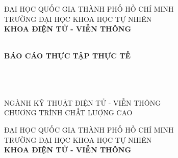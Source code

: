 \hypersetup{pageanchor=false}
\begin{titlepage}

\begin{center}
ĐẠI HỌC QUỐC GIA THÀNH PHỐ HỒ CHÍ MINH\\
TRƯỜNG ĐẠI HỌC KHOA HỌC TỰ NHIÊN\\
\textbf{KHOA ĐIỆN TỬ - VIỄN THÔNG}\\[2cm]


{ \Large \bfseries {} \\[2cm] } 

{ \Large \bfseries \textbf{BÁO CÁO THỰC TẬP THỰC TẾ} \\[3cm]} 


\large \tenKL \\ 
\large \text{} \\ 
\large \text{} \\
\large NGÀNH KỸ THUẬT ĐIỆN TỬ - VIỄN THÔNG\\
\large CHƯƠNG TRÌNH CHẤT LƯỢNG CAO\\


\vfill
{}

\end{center}

\pagebreak

\myemptypage

\begin{center}
ĐẠI HỌC QUỐC GIA THÀNH PHỐ HỒ CHÍ MINH\\
TRƯỜNG ĐẠI HỌC KHOA HỌC TỰ NHIÊN\\
\textbf{KHOA ĐIỆN TỬ - VIỄN THÔNG}\\[2cm]



\end{center}
\end{titlepage}
